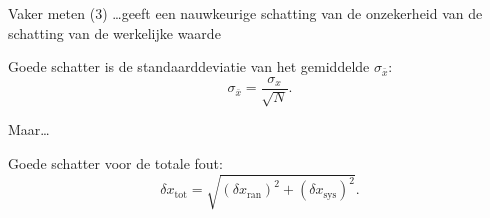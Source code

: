 \documentclass{beamer}
\begin{document}
\begin{frame}{Vaker meten (3)}
  \dots geeft een nauwkeurige schatting van de onzekerheid van de schatting van de werkelijke waarde
  \begin{center}
  \end{center}
  {Goede schatter is de standaarddeviatie van het gemiddelde $\sigma_{\bar x}$:
  \begin{equation*}
    \sigma_{\bar x} = \frac{\sigma_x}{\sqrt N}.
  \end{equation*}}
\end{frame}

\begin{frame}{Maar\dots}
   
  \begin{center}
  \end{center}
  {Goede schatter voor de totale fout:
  \begin{equation*}
    \delta x_\mathrm{tot} = \sqrt{(\delta x_\mathrm{ran})^2 + (\delta x_\mathrm{sys})^2}.
  \end{equation*}}
\end{frame}
\end{document}

